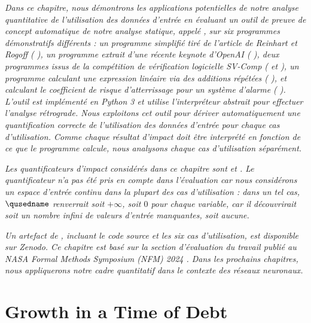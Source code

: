 \emph{Dans ce chapitre, nous démontrons les applications potentielles de notre analyse quantitative de l'utilisation des données d'entrée en évaluant un outil de preuve de concept automatique de notre analyse statique, appelé \impatto\sidenotemark[\ref{impatto}], sur six programmes démonstratifs différents : un programme simplifié tiré de l'article de Reinhart et Rogoff (\cf{} ), un programme extrait d'une récente keynote d'OpenAI (\cf{} ), deux programmes issus de la compétition de vérification logicielle SV-Comp (\cf{}  et ), un programme calculant une expression linéaire via des additions répétées (\cf{} ), et  calculant le coefficient de risque d'atterrissage pour un système d'alarme (\cf{} ). L'outil \impatto{} est implémenté en Python 3 et utilise l'interpréteur abstrait \interproc\sidenotemark[\ref{interproc}] pour effectuer l'analyse rétrograde. Nous exploitons cet outil pour dériver automatiquement une quantification correcte de l'utilisation des données d'entrée pour chaque cas d'utilisation. Comme chaque résultat d'impact doit être interprété en fonction de ce que le programme calcule, nous analysons chaque cas d'utilisation séparément.
}

\emph{
Les quantificateurs d'impact considérés dans ce chapitre sont \outcomesname{} et \rangename{}. Le quantificateur \qusedname{} n'a pas été pris en compte dans l'évaluation car nous considérons un espace d'entrée continu dans la plupart des cas d'utilisation : dans un tel cas, $\qusedname$ renverrait soit $+\infty$, soit $0$ pour chaque variable, car il découvrirait soit un nombre infini de valeurs d'entrée manquantes, soit aucune.
}

\emph{
Un artefact de \impatto, incluant le code source et les six cas d'utilisation, est disponible sur Zenodo\sidenote{\impattozenodo}. Ce chapitre est basé sur la section d'évaluation du travail publié au NASA Formal Methods Symposium (NFM) 2024 . Dans les prochains chapitres, nous appliquerons notre cadre quantitatif dans le contexte des réseaux neuronaux.
}

\section{Growth in a Time of Debt}


